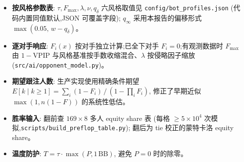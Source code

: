\documentclass[12pt,a4paper]{ctexart}
\begin{document}
\begin{itemize}
  \item \textbf{按风格参数表}: $\tau, F_{\max}, \lambda, \nu, q_\delta$
        六风格取值见 \texttt{config/bot\_profiles.json}
        (代码内置同值默认,JSON 可覆盖字段);
        $q_\infty$ 采用本报告的偏移形式 $\max(0.05,\, w - q_\delta)$。
  \item \textbf{逐对手响应}: $F_i(x)$ 按对手独立计算;已全下对手
        $F_i = 0$;有观测数据时 $F_{\max}$ 由 $1-\mathrm{VPIP}$
        与风格基准按手数收缩混合、$\lambda$ 按侵略因子缩放
        (\texttt{src/ai/opponent\_model.py})。
  \item \textbf{期望跟注人数}: 生产实现使用精确条件期望
        $E[k \mid k \ge 1] = \sum_i (1-F_i) \,/\, (1 - \prod_i F_i)$,
        修正了早期近似 $\max(1, n(1-F))$ 的系统性低估。
  \item \textbf{胜率输入}: 翻前查 $169 \times 8$ 多人 equity share 表
        (每格 $\ge 5\times10^4$ 次模拟,\texttt{scripts/build\_preflop\_table.py});
        翻后为 tie 校正的蒙特卡洛 equity share。
  \item \textbf{温度防护}: $T = \tau \cdot \max(P, 1\,\mathrm{BB})$,
        避免 $P=0$ 时的除零。
\end{itemize}
\end{document}
